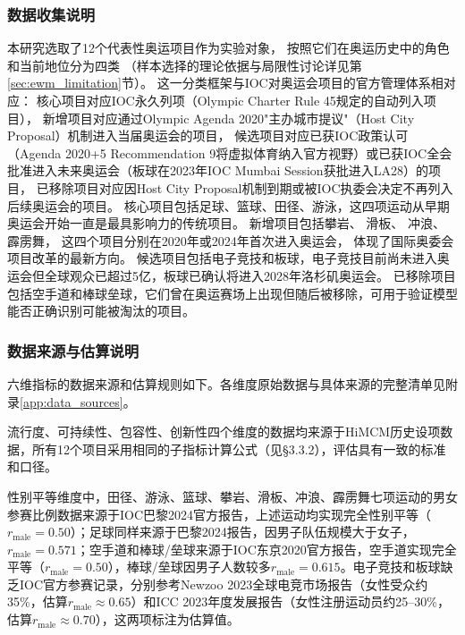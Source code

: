 \documentclass[twoside]{CUGThesis}
\begin{document}
\subsubsection{数据收集说明}

本研究选取了12个代表性奥运项目\cite{Song2025}作为实验对象，
按照它们在奥运历史中的角色和当前地位分为四类
（样本选择的理论依据与局限性讨论详见第\ref{sec:ewm_limitation}节）。
这一分类框架与IOC对奥运会项目的官方管理体系\cite{IOC2023}相对应：
核心项目对应IOC永久列项（Olympic Charter Rule 45规定的自动列入项目），
新增项目对应通过Olympic Agenda 2020\cite{IOC2023}"主办城市提议"（Host City Proposal）机制进入当届奥运会的项目，
候选项目对应已获IOC政策认可（Agenda 2020+5 Recommendation 9将虚拟体育纳入官方视野\cite{IOC2023}）或已获IOC全会批准进入未来奥运会（板球在2023年IOC Mumbai Session获批进入LA28）的项目，
已移除项目对应因Host City Proposal机制到期或被IOC执委会决定不再列入后续奥运会的项目。
核心项目包括足球、篮球、田径、游泳，这四项运动从早期奥运会开始一直是最具影响力的传统项目。
新增项目包括攀岩、
滑板、
冲浪、
霹雳舞，
这四个项目分别在2020年或2024年首次进入奥运会，
体现了国际奥委会项目改革的最新方向。
候选项目包括电子竞技和板球，电子竞技目前尚未进入奥运会但全球观众已超过5亿，板球已确认将进入2028年洛杉矶奥运会。
已移除项目包括空手道和棒球垒球，它们曾在奥运赛场上出现但随后被移除，可用于验证模型能否正确识别可能被淘汰的项目。

\subsubsection{数据来源与估算说明}

六维指标的数据来源和估算规则如下。各维度原始数据与具体来源的完整清单见附录\ref{app:data_sources}。

流行度、可持续性、包容性、创新性四个维度的数据均来源于HiMCM历史设项数据，所有12个项目采用相同的子指标计算公式（见§3.3.2），评估具有一致的标准和口径。

性别平等维度中，田径、游泳、篮球、攀岩、滑板、冲浪、霹雳舞七项运动的男女参赛比例数据来源于IOC巴黎2024官方报告，上述运动均实现完全性别平等（$r_{\text{male}}=0.50$）；足球同样来源于巴黎2024报告，因男子队伍规模大于女子，$r_{\text{male}}=0.571$；空手道和棒球/垒球来源于IOC东京2020官方报告，空手道实现完全平等（$r_{\text{male}}=0.50$），棒球/垒球因男子人数较多$r_{\text{male}}=0.615$。电子竞技和板球缺乏IOC官方参赛记录，分别参考Newzoo 2023全球电竞市场报告（女性受众约35\%，估算$r_{\text{male}}\approx0.65$）和ICC 2023年度发展报告（女性注册运动员约25--30\%，估算$r_{\text{male}}\approx0.70$），这两项标注为估算值。
\end{document}
